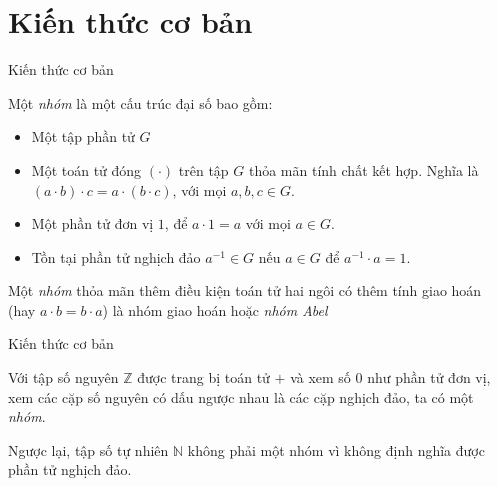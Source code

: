 \documentclass [xcolor=svgnames, t] {beamer}
\theoremstyle{definition}
\begin{document}
\section{Kiến thức cơ bản}
\begin{frame}{Kiến thức cơ bản}
    \begin{definition}
        \label{define:2.1}
        Một \textit{nhóm} là một cấu trúc đại số bao gồm:
        \begin{itemize}
            \item Một tập phần tử $G$
            \item Một toán tử đóng $(\cdot)$ trên tập $G$ thỏa mãn tính chất kết hợp. Nghĩa là $(a \cdot b) \cdot c  = a \cdot (b \cdot c)$, với mọi $a, b, c \in G$.
            \item Một phần tử đơn vị $1$, để $a \cdot 1 = a$ với mọi $a \in G$.
            \item Tồn tại phần tử nghịch đảo $a^{-1} \in G$ nếu $a \in G$ để $a^{-1} \cdot a = 1$.
        \end{itemize}

        Một \textit{nhóm} thỏa mãn thêm điều kiện toán tử hai ngôi có thêm tính giao hoán (hay $a \cdot b = b \cdot a$) là nhóm giao hoán hoặc \textit{nhóm Abel}
    \end{definition}
\end{frame}
\begin{frame}{Kiến thức cơ bản}
    \begin{example}
        Với tập số nguyên $\mathbb{Z}$ được trang bị toán tử $+$ và xem số $0$ như phần tử đơn vị,
        xem các cặp số nguyên có dấu ngược nhau là các cặp nghịch đảo, ta có một \textit{nhóm}.

        Ngược lại, tập số tự nhiên $\mathbb{N}$ không phải một nhóm vì không định nghĩa được phần tử nghịch đảo.
    \end{example}
\end{frame}
\end{document}
